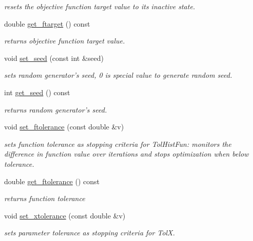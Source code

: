 \begin{DoxyCompactItemize}
\begin{DoxyCompactList}\small\item\em resets the objective function target value to its inactive state. \end{DoxyCompactList}\item 
double \hyperlink{classlibcmaes_1_1Parameters_ae7b39c351afbbb75a657ea5990899782}{get\-\_\-ftarget} () const 
\begin{DoxyCompactList}\small\item\em returns objective function target value. \end{DoxyCompactList}\item 
void \hyperlink{classlibcmaes_1_1Parameters_ac27d3bc99f554d771c24a1129ece2181}{set\-\_\-seed} (const int \&seed)
\begin{DoxyCompactList}\small\item\em sets random generator's seed, 0 is special value to generate random seed. \end{DoxyCompactList}\item 
int \hyperlink{classlibcmaes_1_1Parameters_af98c1effaa3e0a4321ae5046f1bdd615}{get\-\_\-seed} () const 
\begin{DoxyCompactList}\small\item\em returns random generator's seed. \end{DoxyCompactList}\item 
void \hyperlink{classlibcmaes_1_1Parameters_ad01dddcc81b121f20afeaafc09537304}{set\-\_\-ftolerance} (const double \&v)
\begin{DoxyCompactList}\small\item\em sets function tolerance as stopping criteria for Tol\-Hist\-Fun\-: monitors the difference in function value over iterations and stops optimization when below tolerance. \end{DoxyCompactList}\item 
double \hyperlink{classlibcmaes_1_1Parameters_a64b1867aa4d9aeb946e923d42452ff8d}{get\-\_\-ftolerance} () const 
\begin{DoxyCompactList}\small\item\em returns function tolerance \end{DoxyCompactList}\item 
void \hyperlink{classlibcmaes_1_1Parameters_aa131adbd299a29259034cac7cfe83009}{set\-\_\-xtolerance} (const double \&v)
\begin{DoxyCompactList}\small\item\em sets parameter tolerance as stopping criteria for Tol\-X. \end{DoxyCompactList}\item 

\end{DoxyCompactItemize}
